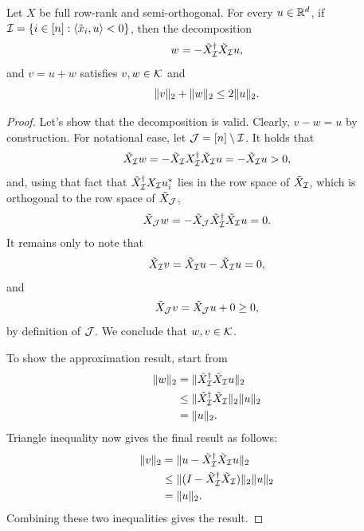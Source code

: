     \begin{proposition}\label{prop:orthogonal-decomp}
        Let \( X \) be full row-rank and semi-orthogonal.
        For every \( u \in \mathbb{R}^d \),
        if \( \mathcal{I} = \left\{i \in [n] : \left\langle\tilde x_i, u\right\rangle < 0\right\} \), then the decomposition
        \[
            w = - \tilde X_{\mathcal{I}}^\dagger \tilde X_{\mathcal{I}} u,
        \]
        and \( v = u + w \) satisfies \( v, w \in \mathcal{K} \) and
        \[
            \|v\|_2 + \|w\|_2 \leq 2 \|u\|_2.
        \]
    \end{proposition}
    \begin{proof}
        Let's show that the decomposition is valid.
        Clearly, \( v - w = u \) by construction.
        For notational ease, let \( \mathcal{J} = [n] \setminus \mathcal{I} \).
        It holds that
        \[
            \tilde X_{\mathcal{I}} w = - \tilde X_{\mathcal{I}} X_{\mathcal{I}}^\dagger \tilde X_{\mathcal{I}} u = - \tilde X_{\mathcal{I}} u > 0,
        \]
        and, using that fact that \( \tilde X_{\mathcal{I}}^\dagger X_{\mathcal{I}} u_i^* \) lies in the row space of \( \tilde X_{\mathcal{I}} \), which is orthogonal to the row space of \( \tilde X_{\mathcal{J}} \),
        \[
            \tilde X_{\mathcal{J}} w = - \tilde X_{\mathcal{J}} \tilde X_{\mathcal{I}}^\dagger \tilde X_{\mathcal{I}} u = 0.
        \]
        It remains only to note that
        \[
            \tilde X_{\mathcal{I}} v = \tilde X_{\mathcal{I}} u - \tilde X_{\mathcal{I}} u = 0,
        \]
        and
        \[
            \tilde X_{\mathcal{J}} v = \tilde X_{\mathcal{J}} u + 0 \geq 0,
        \]
        by definition of \( \mathcal{J} \).
        We conclude that \( w, v \in \mathcal{K} \).

        To show the approximation result, start from
        \begin{align*}
            \|w\|_2
             & = \|\tilde X_{\mathcal{I}}^\dagger \tilde X_{\mathcal{I}} u\|_2             \\
             & \leq \|\tilde X_{\mathcal{I}}^\dagger \tilde X_{\mathcal{I}}\|_2 \|u\|_2 \\
             & = \|u\|_2.
        \end{align*}
        Triangle inequality now gives the final result as follows:
        \begin{align*}
            \|v\|_2
             & = \|u - \tilde X_{\mathcal{I}}^\dagger \tilde X_{\mathcal{I}} u\|_2               \\
             & \leq \|(I - \tilde X_{\mathcal{I}}^\dagger \tilde X_{\mathcal{I}})\|_2 \|u\|_2 \\
             & = \|u\|_2.
        \end{align*}
        Combining these two inequalities gives the result.
    \end{proof}
\fi

